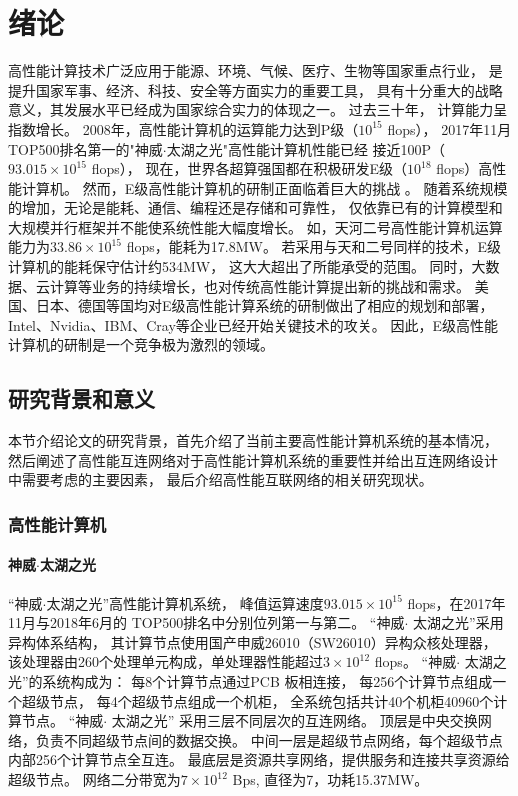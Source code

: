 \chapter{绪论}

高性能计算技术广泛应用于能源、环境、气候、医疗、生物等国家重点行业，
是提升国家军事、经济、科技、安全等方面实力的重要工具，
具有十分重大的战略意义，其发展水平已经成为国家综合实力的体现之一。
过去三十年， 计算能力呈指数增长。
2008年，高性能计算机的运算能力达到P级（$10^{15}$ flops），
2017年11月TOP500排名第一的"神威$\cdot$太湖之光"高性能计算机性能已经
接近100P（$93.015\times10^{15}$ flops），
现在，世界各超算强国都在积极研发E级（$10^{18}$ flops）高性能计算机。
然而，E级高性能计算机的研制正面临着巨大的挑战
。
随着系统规模的增加，无论是能耗、通信、编程还是存储和可靠性，
仅依靠已有的计算模型和大规模并行框架并不能使系统性能大幅度增长。
如，天河二号高性能计算机运算能力为$33.86\times10^{15}$ flops，能耗为17.8MW。
若采用与天和二号同样的技术，E级计算机的能耗保守估计约534MW，
这大大超出了所能承受的范围。
同时，大数据、云计算等业务的持续增长，也对传统高性能计算提出新的挑战和需求。
美国、日本、德国等国均对E级高性能计算系统的研制做出了相应的规划和部署，
Intel、Nvidia、IBM、Cray等企业已经开始关键技术的攻关。
因此，E级高性能计算机的研制是一个竞争极为激烈的领域。

\section{研究背景和意义}
本节介绍论文的研究背景，首先介绍了当前主要高性能计算机系统的基本情况，
然后阐述了高性能互连网络对于高性能计算机系统的重要性并给出互连网络设计
中需要考虑的主要因素，
最后介绍高性能互联网络的相关研究现状。

\subsection{高性能计算机}

\subsubsection{神威$\cdot$太湖之光}
“神威$\cdot$太湖之光”高性能计算机系统，
峰值运算速度$93.015\times10^{15}$ flops，在2017年11月与2018年6月的
TOP500排名中分别位列第一与第二。
“神威$\cdot$ 太湖之光”采用异构体系结构，
其计算节点使用国产申威26010（SW26010）异构众核处理器，
该处理器由260个处理单元构成，单处理器性能超过$3\times10^{12}$ flops。
“神威$\cdot$ 太湖之光”的系统构成为：
每8个计算节点通过PCB 板相连接，
每256个计算节点组成一个超级节点，
每4个超级节点组成一个机柜，
全系统包括共计40个机柜40960个计算节点。
“神威$\cdot$ 太湖之光” 采用三层不同层次的互连网络。
顶层是中央交换网络，负责不同超级节点间的数据交换。
中间一层是超级节点网络，每个超级节点内部256个计算节点全互连。
最底层是资源共享网络，提供服务和连接共享资源给超级节点。
网络二分带宽为$7\times10^{12}$ Bps, 直径为7，功耗15.37MW。

